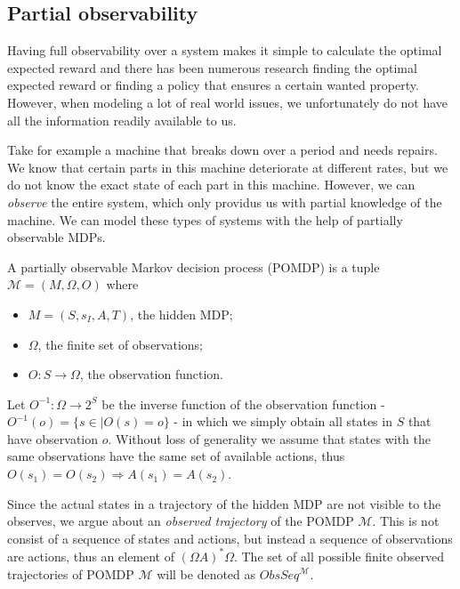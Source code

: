 \subsection{Partial observability}
Having full observability over a system makes it simple to calculate the optimal expected reward and there has been numerous research finding the optimal expected reward or finding a policy that ensures a certain wanted property. However, when modeling a lot of real world issues, we unfortunately do not have all the information readily available to us.

Take for example a machine that breaks down over a period and needs repairs\cite{p:maintenance}. We know that certain parts in this machine deteriorate at different rates, but we do not know the exact state of each part in this machine. However, we can \textit{observe} the entire system, which only providus us with partial knowledge of the machine. We can model these types of systems with the help of partially observable MDPs.

\begin{definition}[POMDP]
	A partially observable Markov decision process (POMDP) is a tuple $\mathcal{M}=(M, \Omega, O)$ where 
	\begin{itemize}
		\item $M=(S,s_I,A,T)$, the hidden MDP;
		\item $\Omega$, the finite set of observations;
		\item $O:S\to \Omega$, the observation function. 
	\end{itemize}
\end{definition}

Let $O^{-1}:\Omega\to 2^S$ be the inverse function of the observation function - $O^{-1}(o)=\{s\in \mid O(s)=o\}$ - in which we simply obtain all states in $S$ that have observation $o$.
Without loss of generality we assume that states with the same observations have the same set of available actions, thus $O(s_1)=O(s_2)\Rightarrow A(s_1)=A(s_2)$.

Since the actual states in a trajectory of the hidden MDP are not visible to the observes, we argue about an \textit{observed trajectory} of the POMDP $\mathcal{M}$. This is not consist of a sequence of states and actions, but instead a sequence of observations are actions, thus an element of $(\Omega A)^*\Omega$. The set of all possible finite observed trajectories of POMDP $\mathcal{M}$ will be denoted as $ObsSeq^{\mathcal{M}}$.

